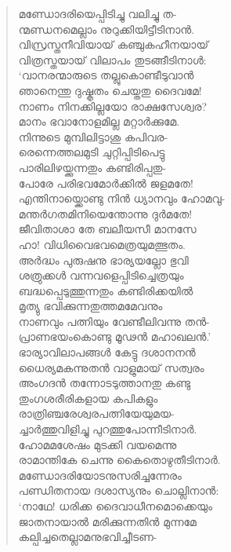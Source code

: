 \begin{verse}
മണ്ഡോദരിയെപ്പിടിച്ചു വലിച്ചു ത-\\
ന്മണ്ഡനമെല്ലാം നുറുക്കിയിട്ടീടിനാന്‍.\\
വിസ്രസ്തനീവിയായ് കഞ്ചുകഹീനയായ്\\
വിത്രസ്തയായ് വിലാപം തുടങ്ങീടിനാള്‍:\\
‘വാനരന്മാരുടെ തല്ലുകൊണ്ടീടുവാന്‍\\
ഞാനെന്തു ദുഷ്കൃതം ചെയ്തതു ദൈവമേ!\\
നാണം നിനക്കില്ലയോ രാക്ഷസേശ്വര?\\
മാനം ഭവാനോളമില്ല മറ്റാര്‍ക്കുമേ.\\
നിന്നുടെ മുമ്പിലിട്ടാശു കപിവര-\\
രെന്നെത്തലമുടി ചുറ്റിപ്പിടിപെട്ടു\\
പാരിലിഴയ്ക്കുന്നതും കണ്ടിരിപ്പതു-\\
പോരേ പരിഭവമോര്‍ക്കില്‍ ജളമതേ!\\
എന്തിനായ്ക്കൊണ്ടു നിന്‍ ധ്യാനവും ഹോമവു-\\
മന്തര്‍ഗതമിനിയെന്തോന്നു ദുര്‍മതേ!\\
ജീവിതാശാ തേ ബലീയസീ മാനസേ\\
ഹാ! വിധിവൈഭവമെത്രയുമത്ഭുതം.\\
അര്‍ദ്ധം പുരുഷനു ഭാര്യയല്ലോ ഭുവി\\
ശത്രുക്കള്‍ വന്നവളെപ്പിടിച്ചെത്രയും\\
ബദ്ധപ്പെടുത്തുന്നതും കണ്ടിരിക്കയില്‍\\
മൃത്യു ഭവിക്കുന്നതുത്തമമേവനും\\
നാണവും പത്നിയും വേണ്ടീലിവന്നു തന്‍-\\
പ്രാണഭയംകൊണ്ടു മൂഢന്‍ മഹാഖലന്‍.’\\
ഭാര്യാവിലാപങ്ങള്‍ കേട്ടു ദശാനനന്‍\\
ധൈര്യമകന്നുതന്‍ വാളുമായ് സത്വരം\\
അംഗദന്‍ തന്നോടടുത്താനതു കണ്ടു\\
തുംഗശരീരികളായ കപികളും\\
രാത്രിഞ്ചരേശ്വരപത്നിയേയുമയ-\\
ച്ചാര്‍ത്തുവിളിച്ചു പുറത്തുപോന്നീടിനാര്‍.\\
ഹോമമശേഷം മുടക്കി വയമെന്നു\\
രാമാന്തികേ ചെന്നു കൈതൊഴുതീടിനാര്‍.\\
മണ്ഡോദരിയോടനുസരിച്ചന്നേരം\\
പണ്ഡിതനായ ദശാസ്യനും ചൊല്ലിനാന്‍:\\
‘നാഥേ! ധരിക്ക ദൈവാധീനമൊക്കെയും\\
ജാതനായാല്‍ മരിക്കുന്നതിന്‍ മുന്നമേ\\
കല്പിച്ചതെല്ലാമനുഭവിച്ചീടണ-\\

\end{verse}
